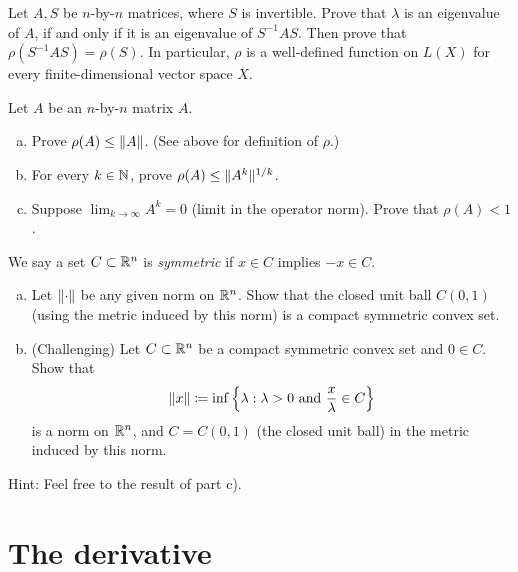 \begin{exercise}
Let $A,S$ be $n$-by-$n$ matrices, where $S$ is invertible.
Prove that $\lambda$ is an eigenvalue of $A$, if and only
if it is an eigenvalue of $S^{-1}AS$.  Then prove that
$\rho(S^{-1}AS) = \rho(S)$.
In particular, $\rho$ is a well-defined function on $L(X)$ for
every finite-dimensional vector space $X$.
\end{exercise}

\begin{exercise}
\pagebreak[2]
Let $A$ be an $n$-by-$n$ matrix $A$.
\begin{enumerate}[a)]
\item
Prove $\rho(A) \leq \lVert {A} \rVert$.  (See above for definition of $\rho$.)
\item
For every $k \in {\mathbb{N}}$, prove
$\rho(A) \leq \lVert {A^k} \rVert^{1/k}$.
\item
Suppose $\displaystyle \lim_{k\to\infty} A^k = 0$ (limit in the operator norm).
Prove that $\rho(A) < 1$.
\end{enumerate}
\end{exercise}

\begin{exercise}
We say a set $C \subset {\mathbb{R}}^n$ is \emph{symmetric} if
$x \in C$ implies $-x \in C$.
\begin{enumerate}[a)]
\item
Let $\lVert {\cdot} \rVert$ be any given norm on ${\mathbb{R}}^n$.  Show that the closed unit ball
$C(0,1)$ (using the metric induced by this norm)
is a compact symmetric convex set.
\item (Challenging)
Let $C \subset {\mathbb{R}}^n$ be a compact symmetric convex set and $0 \in C$.  Show that
\begin{equation*}
\lVert {x} \rVert \coloneqq \inf \left\{ \lambda : \lambda > 0 \text{ and } \frac{x}{\lambda} \in C \right\}
\end{equation*}
is a norm on ${\mathbb{R}}^n$, and $C = C(0,1)$ (the closed unit ball) in the metric induced by this norm.
\end{enumerate}
Hint: Feel free to the result of  part c).
\end{exercise}


\sectionnewpage
\section{The derivative}
\label{sec:svtheder}

